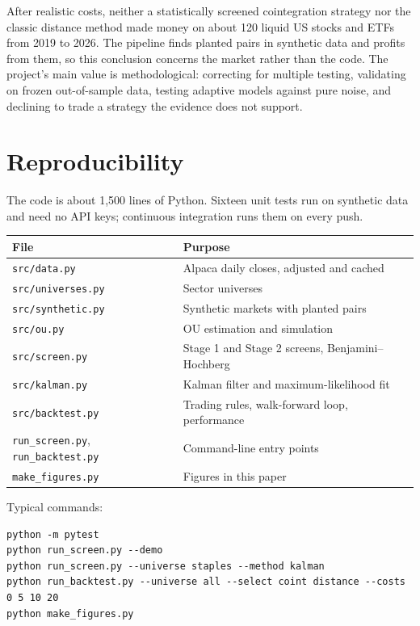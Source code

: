 \documentclass[11pt]{article}
\newcommand{\code}[1]{\texttt{#1}}
\begin{document}
After realistic costs, neither a statistically screened cointegration strategy nor the
classic distance method made money on about 120 liquid US stocks and ETFs from 2019 to 2026.
The pipeline finds planted pairs in synthetic data and profits from them, so this conclusion
concerns the market rather than the code. The project's main value is methodological:
correcting for multiple testing, validating on frozen out-of-sample data, testing adaptive
models against pure noise, and declining to trade a strategy the evidence does not support.

\appendix
\section{Reproducibility}

The code is about 1{,}500 lines of Python. Sixteen unit tests run on synthetic data and need
no API keys; continuous integration runs them on every push.

\begin{table}[ht]
\centering
\small
\begin{tabular}{ll}
\toprule
File & Purpose\\
\midrule
\code{src/data.py} & Alpaca daily closes, adjusted and cached\\
\code{src/universes.py} & Sector universes\\
\code{src/synthetic.py} & Synthetic markets with planted pairs\\
\code{src/ou.py} & OU estimation and simulation\\
\code{src/screen.py} & Stage 1 and Stage 2 screens, Benjamini--Hochberg\\
\code{src/kalman.py} & Kalman filter and maximum-likelihood fit\\
\code{src/backtest.py} & Trading rules, walk-forward loop, performance\\
\code{run\_screen.py}, \code{run\_backtest.py} & Command-line entry points\\
\code{make\_figures.py} & Figures in this paper\\
\bottomrule
\end{tabular}
\end{table}

\noindent Typical commands:
\begin{verbatim}
python -m pytest
python run_screen.py --demo
python run_screen.py --universe staples --method kalman
python run_backtest.py --universe all --select coint distance --costs 0 5 10 20
python make_figures.py
\end{verbatim}
\end{document}
